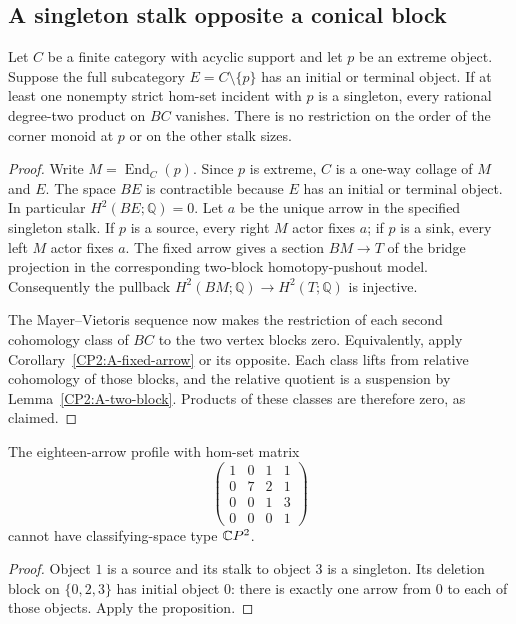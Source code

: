 \subsection{A singleton stalk opposite a conical block}

\begin{proposition}
\label{CP2:A-singleton-stalk-conical-block}
Let $C$ be a finite category with acyclic support and
let $p$ be an extreme object. Suppose the full subcategory
$E=C\setminus\{p\}$ has an initial or terminal object.
If at least one nonempty strict hom-set incident with
$p$ is a singleton, every rational degree-two product
on $BC$ vanishes. There is no restriction on the order
of the corner monoid at $p$ or on the other stalk sizes.
\end{proposition}
\begin{proof}
Write $M=\operatorname{End}_C(p)$. Since $p$ is extreme,
$C$ is a one-way collage of $M$ and $E$. The space
$BE$ is contractible because $E$ has an initial or
terminal object. In particular $H^2(BE;\mathbb Q)=0$.
Let $a$ be the unique arrow in the specified singleton
stalk. If $p$ is a source, every right $M$ actor fixes
$a$; if $p$ is a sink, every left $M$ actor fixes $a$.
The fixed arrow gives a section $BM\to T$ of the
bridge projection in the corresponding two-block
homotopy-pushout model. Consequently the pullback
$H^2(BM;\mathbb Q)\to H^2(T;\mathbb Q)$ is injective.

The Mayer--Vietoris sequence now makes the restriction
of each second cohomology class of $BC$ to the two
vertex blocks zero. Equivalently, apply
Corollary~\ref{CP2:A-fixed-arrow} or its opposite.
Each class lifts from relative cohomology of those
blocks, and the relative quotient is a suspension by
Lemma~\ref{CP2:A-two-block}. Products of these classes
are therefore zero, as claimed.
\end{proof}

\begin{corollary}
\label{CP2:A-four-eighteen-profile-2285}
The eighteen-arrow profile with hom-set matrix
\[
\begin{pmatrix}
1&0&1&1\\
0&7&2&1\\
0&0&1&3\\
0&0&0&1
\end{pmatrix}
\]
cannot have classifying-space type $\mathbb{C}P^2$.
\end{corollary}
\begin{proof}
Object $1$ is a source and its stalk to object $3$ is
a singleton. Its deletion block on $\{0,2,3\}$ has
initial object $0$: there is exactly one arrow from
$0$ to each of those objects. Apply the proposition.
\end{proof}
